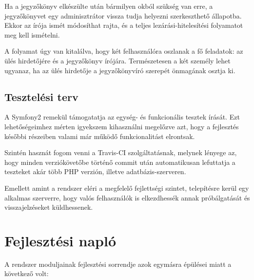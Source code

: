 \documentclass[a4paper,12pt,oneside]{report}
\begin{document}
Ha a jegyzőkönyv elkészülte után bármilyen okból szükség van erre, a jegyzőkönyvet egy adminisztrátor vissza tudja helyezni szerkeszthető állapotba. Ekkor az írója ismét módosíthat rajta, és a teljes lezárási-hitelesítési folyamatot meg kell ismételni.

A folyamat úgy van kitalálva, hogy két felhasználóra oszlanak a fő feladatok: az ülés hirdetőjére és a jegyzőkönyv írójára. Természetesen a két személy lehet ugyanaz, ha az ülés hirdetője a jegyzőkönyvíró szerepét önmagának osztja ki.

\subsection{Tesztelési terv}

A Symfony2 remekül támogatatja az egység- és funkcionális tesztek írását. Ezt lehetőségeimhez mérten igyekszem kihasználni megelőzve azt, hogy a fejlesztés későbbi részeiben valami már működő funkcionalitást elrontsak.

Szintén hasznát fogom venni a Travis-CI szolgáltatásnak, melynek lényege az, hogy minden verziókövetőbe történő commit után automatikusan lefuttatja a teszteket akár több PHP verzión, illetve adatbázis-szerveren.

Emellett amint a rendszer eléri a megfelelő fejlettségi szintet, telepítésre kerül egy alkalmas szerverre, hogy valós felhasználók is elkezdhessék annak próbálgatását és visszajelzéseket küldhessenek.

\section{Fejlesztési napló}

A rendszer moduljainak fejlesztési sorrendje azok egymásra épülései miatt a következő volt:
\end{document}
